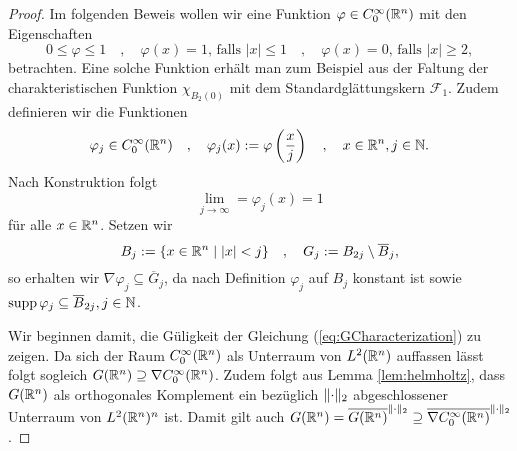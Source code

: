 \begin{proof}
  Im folgenden Beweis wollen wir eine Funktion $\varphi \in C_0^\infty(\mathbb{R}^n)$ mit den Eigenschaften
  \begin{equation}
    \label{eq:propPhi}
  0 \leq \varphi \leq 1
  \quad,\quad
  \varphi(x) = 1 \text{, falls } |x| \leq 1
  \quad,\quad
  \varphi(x) = 0 \text{, falls } |x| \geq 2,
\end{equation}
  betrachten.
  Eine solche Funktion erhält man zum Beispiel aus der Faltung der charakteristischen Funktion $\chi_{B_2(0)}$ mit dem Standardglättungskern $\mathcal{F}_1$.
  Zudem definieren wir die Funktionen
  $$
  \varphi_j \in C_0^\infty(\mathbb{R}^n)
  \quad,\quad
  \varphi_j(x) := \varphi\left(\frac{x}{j}\right)
  \quad,\quad
  x \in \mathbb{R}^n, j \in \mathbb{N}.
  $$
  Nach Konstruktion folgt 
  \begin{equation}
    \label{eq:limPhi}
    \lim_{j \to \infty} = \varphi_j(x) = 1
  \end{equation}
  für alle $x \in \mathbb{R}^n$.
  Setzen wir
  $$
  B_j := \{ x \in \mathbb{R}^n \mid |x| < j \} 
  \quad,\quad
  G_j := B_{2j}\setminus \overline B_j,
  $$
  so erhalten wir $\nabla \varphi_j \subseteq \overline G_j$, da nach Definition $\varphi_j$ auf $B_j$ konstant ist sowie $\operatorname{supp} \varphi_j \subseteq \overline B_{2j}, j \in \mathbb{N}$.

  Wir beginnen damit, die Güligkeit der Gleichung (\ref{eq:GCharacterization}) zu zeigen.
  Da sich der Raum $C_0^\infty(\mathbb{R}^n)$ als Unterraum von $L^2(\mathbb{R}^n)$ auffassen lässt folgt sogleich $G(\mathbb{R}^n) \supseteq \nabla C_0^\infty(\mathbb{R}^n)$.
  Zudem folgt aus Lemma \ref{lem:helmholtz}, dass $G(\mathbb{R}^n)$ als orthogonales Komplement ein bezüglich $\lVert \cdot \rVert_2$ abgeschlossener Unterraum von $L^2(\mathbb{R}^n)^n$ ist.
  Damit gilt auch $G(\mathbb{R}^n) = \overline{G(\mathbb{R}^n)}^{\lVert \cdot \rVert_2} \supseteq \overline{\nabla C_0^\infty(\mathbb{R}^n)}^{\lVert \cdot \rVert_2}$.


\end{proof}
